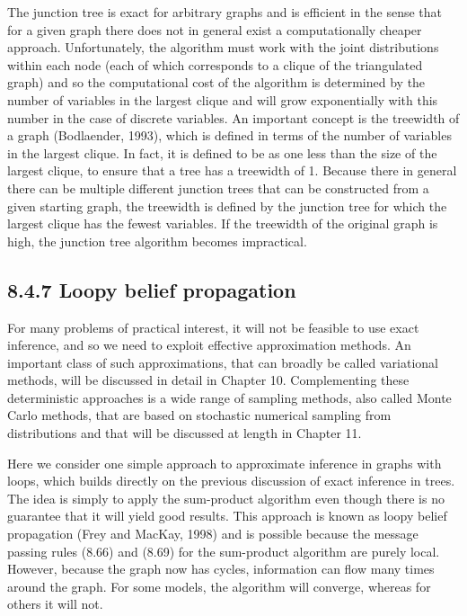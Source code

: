 \documentclass[
  10
]{article}
\begin{document}
The junction tree is exact for arbitrary graphs and is efficient in the
sense that for a given graph there does not in general exist a
computationally cheaper approach. Unfortunately, the algorithm must work
with the joint distributions within each node (each of which corresponds
to a clique of the triangulated graph) and so the computational cost of
the algorithm is determined by the number of variables in the largest
clique and will grow exponentially with this number in the case of
discrete variables. An important concept is the treewidth of a graph
(Bodlaender, 1993), which is defined in terms of the number of variables
in the largest clique. In fact, it is defined to be as one less than the
size of the largest clique, to ensure that a tree has a treewidth of 1.
Because there in general there can be multiple different junction trees
that can be constructed from a given starting graph, the treewidth is
defined by the junction tree for which the largest clique has the fewest
variables. If the treewidth of the original graph is high, the junction
tree algorithm becomes impractical.

\subsection{8.4.7 Loopy belief
propagation}\label{loopy-belief-propagation}

For many problems of practical interest, it will not be feasible to use
exact inference, and so we need to exploit effective approximation
methods. An important class of such approximations, that can broadly be
called variational methods, will be discussed in detail in Chapter 10.
Complementing these deterministic approaches is a wide range of sampling
methods, also called Monte Carlo methods, that are based on stochastic
numerical sampling from distributions and that will be discussed at
length in Chapter 11.

Here we consider one simple approach to approximate inference in graphs
with loops, which builds directly on the previous discussion of exact
inference in trees. The idea is simply to apply the sum-product
algorithm even though there is no guarantee that it will yield good
results. This approach is known as loopy belief propagation (Frey and
MacKay, 1998) and is possible because the message passing rules (8.66)
and (8.69) for the sum-product algorithm are purely local. However,
because the graph now has cycles, information can flow many times around
the graph. For some models, the algorithm will converge, whereas for
others it will not.
\end{document}
